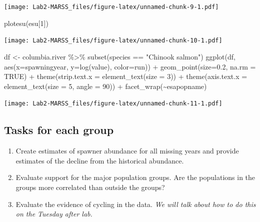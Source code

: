 \documentclass[
]{article}
\newenvironment{Shaded}{\begin{snugshade}}{\end{snugshade}}
\newcommand{\AttributeTok}[1]{\textcolor[rgb]{0.77,0.63,0.00}{#1}}
\newcommand{\ConstantTok}[1]{\textcolor[rgb]{0.00,0.00,0.00}{#1}}
\newcommand{\DecValTok}[1]{\textcolor[rgb]{0.00,0.00,0.81}{#1}}
\newcommand{\FloatTok}[1]{\textcolor[rgb]{0.00,0.00,0.81}{#1}}
\newcommand{\FunctionTok}[1]{\textcolor[rgb]{0.00,0.00,0.00}{#1}}
\newcommand{\NormalTok}[1]{#1}
\newcommand{\OtherTok}[1]{\textcolor[rgb]{0.56,0.35,0.01}{#1}}
\newcommand{\SpecialCharTok}[1]{\textcolor[rgb]{0.00,0.00,0.00}{#1}}
\newcommand{\StringTok}[1]{\textcolor[rgb]{0.31,0.60,0.02}{#1}}
\begin{document}
\texttt{[image: Lab2-MARSS\_files/figure-latex/unnamed-chunk-9-1.pdf]}

\begin{Shaded}
\begin{Highlighting}[]
\FunctionTok{plotesu}\NormalTok{(esu[}\DecValTok{1}\NormalTok{])}
\end{Highlighting}
\end{Shaded}

\texttt{[image: Lab2-MARSS\_files/figure-latex/unnamed-chunk-10-1.pdf]}

\begin{Shaded}
\begin{Highlighting}[]
\NormalTok{df }\OtherTok{\textless{}{-}}\NormalTok{ columbia.river }\SpecialCharTok{\%\textgreater{}\%} \FunctionTok{subset}\NormalTok{(species }\SpecialCharTok{==} \StringTok{"Chinook salmon"}\NormalTok{)}
\FunctionTok{ggplot}\NormalTok{(df, }\FunctionTok{aes}\NormalTok{(}\AttributeTok{x=}\NormalTok{spawningyear, }\AttributeTok{y=}\FunctionTok{log}\NormalTok{(value), }\AttributeTok{color=}\NormalTok{run)) }\SpecialCharTok{+} 
  \FunctionTok{geom\_point}\NormalTok{(}\AttributeTok{size=}\FloatTok{0.2}\NormalTok{, }\AttributeTok{na.rm =} \ConstantTok{TRUE}\NormalTok{) }\SpecialCharTok{+}
  \FunctionTok{theme}\NormalTok{(}\AttributeTok{strip.text.x =} \FunctionTok{element\_text}\NormalTok{(}\AttributeTok{size =} \DecValTok{3}\NormalTok{)) }\SpecialCharTok{+}
  \FunctionTok{theme}\NormalTok{(}\AttributeTok{axis.text.x =} \FunctionTok{element\_text}\NormalTok{(}\AttributeTok{size =} \DecValTok{5}\NormalTok{, }\AttributeTok{angle =} \DecValTok{90}\NormalTok{)) }\SpecialCharTok{+} 
  \FunctionTok{facet\_wrap}\NormalTok{(}\SpecialCharTok{\textasciitilde{}}\NormalTok{esapopname)}
\end{Highlighting}
\end{Shaded}

\texttt{[image: Lab2-MARSS\_files/figure-latex/unnamed-chunk-11-1.pdf]}

\hypertarget{tasks-for-each-group}{%
\subsection{Tasks for each group}\label{tasks-for-each-group}}

\begin{enumerate}
\def\labelenumi{\arabic{enumi}.}
\item
  Create estimates of spawner abundance for all missing years and
  provide estimates of the decline from the historical abundance.
\item
  Evaluate support for the major population groups. Are the populations
  in the groups more correlated than outside the groups?
\item
  Evaluate the evidence of cycling in the data. \emph{We will talk about
  how to do this on the Tuesday after lab.}
\end{enumerate}
\end{document}
